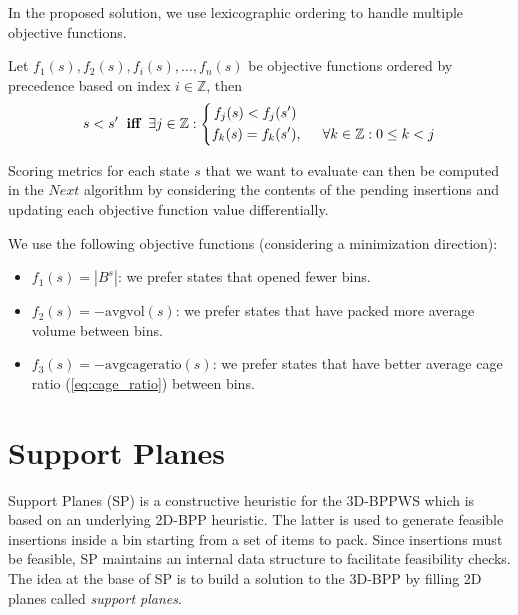 In the proposed solution, we use lexicographic ordering to handle multiple objective functions.
\begin{definition}
    \label{def:lexicographic_ordering}
    Let $f_1(s), f_2(s), f_i(s), \dots, f_n(s)$ be objective functions ordered by precedence based on index $i \in \mathbb{Z}$, then 
    \begin{equation*}
        s < s^\prime \hspace{.2cm} \textbf{iff} \hspace{.2cm} \exists j \in \mathbb{Z} : \left\{
            \begin{aligned}
                f_j(s) < f_j(s^\prime) & \\
                f_k(s) = f_k(s^\prime) &,\hspace{.5cm} \forall k \in \mathbb{Z} : 0 \le k < j 
            \end{aligned}
        \right.
    \end{equation*}
\end{definition}

Scoring metrics for each state $s$ that we want to evaluate can then be computed in the $Next$ algorithm by considering the contents of the pending insertions and updating each objective function value differentially.

We use the following objective functions (considering a minimization direction):
\begin{itemize}
    \item $f_1(s) = |B^s|$: we prefer states that opened fewer bins.
    \item $f_2(s) = -\text{avgvol}(s)$: we prefer states that have packed more average volume between bins.
    \item $f_3(s) = -\text{avgcageratio}(s)$: we prefer states that have better average cage ratio (\cref{eq:cage_ratio}) between bins.
\end{itemize}

\section{Support Planes}
\label{sec:support_planes}%
Support Planes (SP) is a constructive heuristic for the 3D-BPPWS which is based on an underlying 2D-BPP heuristic. The latter is used to generate feasible insertions inside a bin starting from a set of items to pack.
Since insertions must be feasible, SP maintains an internal data structure to facilitate feasibility checks.
The idea at the base of SP is to build a solution to the 3D-BPP by filling 2D planes called \textit{support planes}.

